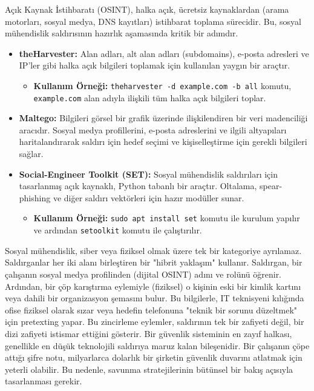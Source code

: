 Açık Kaynak İstihbaratı (OSINT), halka açık, ücretsiz kaynaklardan (arama motorları, sosyal medya, DNS kayıtları) istihbarat toplama sürecidir. Bu, sosyal mühendislik saldırısının hazırlık aşamasında kritik bir adımdır.
\begin{itemize}
    \item \textbf{theHarvester:} Alan adları, alt alan adları (subdomains), e-posta adresleri ve IP'ler gibi halka açık bilgileri toplamak için kullanılan yaygın bir araçtır.
    \begin{itemize}
        \item \textbf{Kullanım Örneği:} \verb|theharvester -d example.com -b all| komutu, \verb|example.com| alan adıyla ilişkili tüm halka açık bilgileri toplar.
    \end{itemize}
    \item \textbf{Maltego:} Bilgileri görsel bir grafik üzerinde ilişkilendiren bir veri madenciliği aracıdır. Sosyal medya profillerini, e-posta adreslerini ve ilgili altyapıları haritalandırarak saldırı için hedef seçimi ve kişiselleştirme için gerekli bilgileri sağlar.
    \item \textbf{Social-Engineer Toolkit (SET):} Sosyal mühendislik saldırıları için tasarlanmış açık kaynaklı, Python tabanlı bir araçtır. Oltalama, spear-phishing ve diğer saldırı vektörleri için hazır modüller sunar.
    \begin{itemize}
        \item \textbf{Kullanım Örneği:} \verb|sudo apt install set| komutu ile kurulum yapılır ve ardından \verb|setoolkit| komutu ile çalıştırılır.
    \end{itemize}
\end{itemize}

Sosyal mühendislik, siber veya fiziksel olmak üzere tek bir kategoriye ayrılamaz. Saldırganlar her iki alanı birleştiren bir "hibrit yaklaşım" kullanır. Saldırgan, bir çalışanın sosyal medya profilinden (dijital OSINT) adını ve rolünü öğrenir. Ardından, bir çöp karıştırma eylemiyle (fiziksel) o kişinin eski bir kimlik kartını veya dahili bir organizasyon şemasını bulur. Bu bilgilerle, IT teknisyeni kılığında ofise fiziksel olarak sızar veya hedefin telefonuna "teknik bir sorunu düzeltmek" için pretexting yapar. Bu zincirleme eylemler, saldırının tek bir zafiyeti değil, bir dizi zafiyeti istismar ettiğini gösterir. Bir güvenlik sisteminin en zayıf halkası, genellikle en düşük teknolojili saldırıya maruz kalan bileşenidir. Bir çalışanın çöpe attığı şifre notu, milyarlarca dolarlık bir şirketin güvenlik duvarını atlatmak için yeterli olabilir. Bu nedenle, savunma stratejilerinin bütünsel bir bakış açısıyla tasarlanması gerekir.



